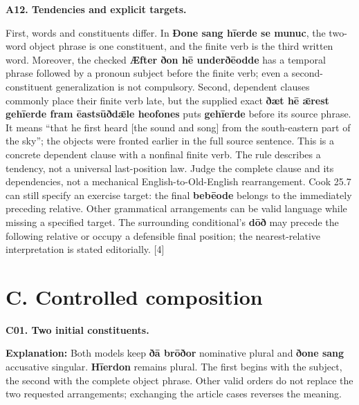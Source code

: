 \par\begin{minipage}{\linewidth}\raggedright
\textbf{A12. Tendencies and explicit targets.}

First, words and constituents differ. In \textbf{Ðone sang hīerde se munuc}, the two-word object phrase is one constituent, and the finite verb is the third written word. Moreover, the checked \textbf{Æfter ðon hē underðēodde} has a temporal phrase followed by a pronoun subject before the finite verb; even a second-constituent generalization is not compulsory. Second, dependent clauses commonly place their finite verb late, but the supplied exact \textbf{ðæt hē ǣrest gehīerde fram ēastsūðdǣle heofones} puts \textbf{gehīerde} before its source phrase. It means “that he first heard [the sound and song] from the south-eastern part of the sky”; the objects were fronted earlier in the full source sentence. This is a concrete dependent clause with a nonfinal finite verb. The rule describes a tendency, not a universal last-position law. Judge the complete clause and its dependencies, not a mechanical English-to-Old-English rearrangement. Cook 25.7 can still specify an exercise target: the final \textbf{bebēode} belongs to the immediately preceding relative. Other grammatical arrangements can be valid language while missing a specified target. The surrounding conditional’s \textbf{dōð} may precede the following relative or occupy a defensible final position; the nearest-relative interpretation is stated editorially. [4]

\end{minipage}\par\addvspace{4pt}

\section*{C. Controlled composition}

\par\begin{minipage}{\linewidth}\raggedright
\textbf{C01. Two initial constituents.}



\textbf{Explanation:} Both models keep \textbf{ðā brōðor} nominative plural and \textbf{ðone sang} accusative singular. \textbf{Hīerdon} remains plural. The first begins with the subject, the second with the complete object phrase. Other valid orders do not replace the two requested arrangements; exchanging the article cases reverses the meaning.

\end{minipage}\par\addvspace{4pt}

